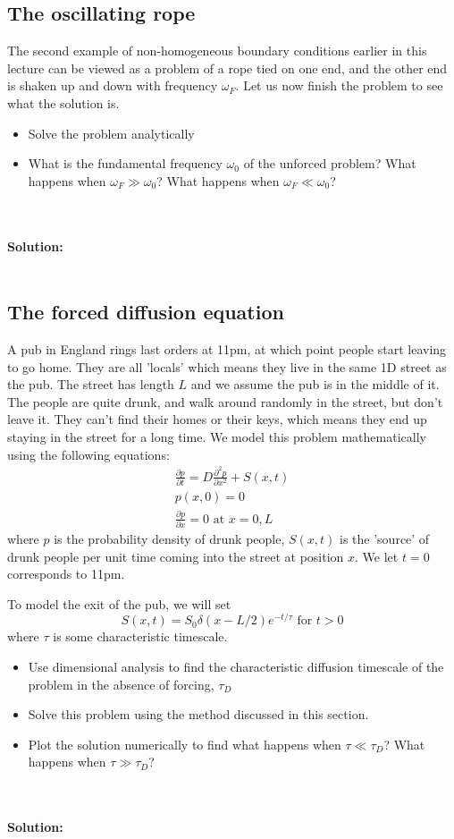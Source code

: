 \subsection{The oscillating rope}

The second example of non-homogeneous boundary conditions earlier in this lecture can be viewed as a problem of a rope tied on one end, and the other end is shaken up and down with frequency $\omega_F$. Let us now finish the problem to see what the solution is. 
\begin{itemize}
    \item Solve the problem analytically
    \item What is the fundamental frequency $\omega_0$ of the unforced problem? What happens when $\omega_F \gg \omega_0$? What happens when $\omega_F \ll \omega_0$?
\end{itemize}
\\
\\
{\color{red}
 {\bf Solution:} 
} 
 \\
 \\
\subsection{The forced diffusion equation}

A pub in England rings last orders at 11pm, at which point people start leaving to go home. They are all 'locals' which means they live in the same 1D street as the pub. The street has length $L$ and we assume the pub is in the middle of it. The people are quite drunk, and walk around randomly in the street, but don't leave it. They can't find their homes or their keys, which means they end up staying in the street for a long time. We model this problem mathematically using the following equations:
\begin{eqnarray}
    \frac{\partial p}{\partial t}  = D \frac{\partial^2 p}{\partial x^2} + S(x,t)\\
    p(x,0) = 0 \\ 
    \frac{\partial p}{\partial x} = 0 \mbox{ at } x = 0,L
\end{eqnarray}
where $p$ is the probability  density of drunk people,  $S(x,t)$ is the 'source' of drunk people per unit time coming into the street at position $x$. 
We let $t = 0$ corresponds to 11pm. 

To model the exit of the pub, we will set
\begin{equation}
    S(x,t) = S_0 \delta(x-L/2) e^{-t/\tau} \mbox{ for } t > 0
\end{equation}
where $\tau$ is some characteristic timescale.
\begin{itemize}
\item Use dimensional analysis to find the characteristic diffusion timescale of the problem in the absence of forcing, $\tau_D$
\item Solve this problem using the method discussed in this section. 
\item Plot the solution numerically to find what happens when $\tau \ll \tau_D$? What happens when $\tau \gg \tau_D$? 
\end{itemize}
\\
\\
{\color{red} {\bf Solution:}}